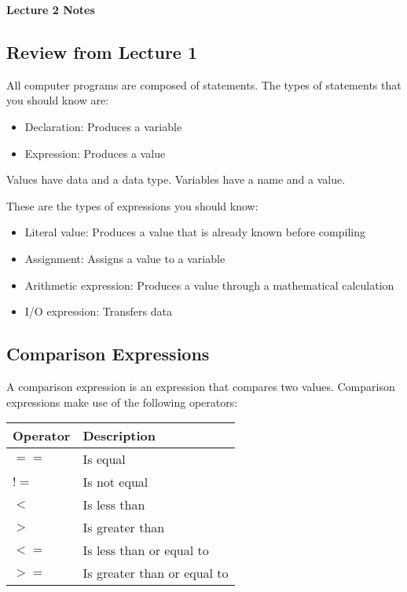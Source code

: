 \documentclass[a4paper,12pt]{article}
\begin{document}
\lstset{frame=single,tabsize=4,basicstyle=\ttfamily}

{\centering \bf \Large
Lecture 2 Notes \\[\baselineskip]
}

\subsection*{Review from Lecture 1}

All computer programs are composed of statements. The types of statements that you should know are: 

\begin{itemize}
\item Declaration: Produces a variable
\item Expression: Produces a value
\end{itemize}

Values have data and a data type. Variables have a name and a value. 

These are the types of expressions you should know:

\begin{itemize}
\item Literal value: Produces a value that is already known before compiling
\item Assignment: Assigns a value to a variable
\item Arithmetic expression: Produces a value through a mathematical calculation
\item I/O expression: Transfers data 
\end{itemize}

\subsection*{Comparison Expressions}

A comparison expression is an expression that compares two values. Comparison expressions make use of the following operators: \\

\begin{tabular}{|l|l|}
\hline
Operator & Description \\ 
\hline
$==$ & Is equal \\
\hline
$!=$ & Is not equal \\
\hline
$<$ & Is less than \\
\hline
$>$ & Is greater than \\
\hline
$<=$ & Is less than or equal to \\
\hline
$>=$ & Is greater than or equal to \\
\hline
\end{tabular} \\
\end{document}
